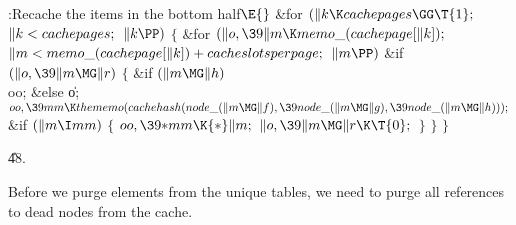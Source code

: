 \B{}:Recache the items in the bottom half\X${}\E{}$\6
\&{for} ${}(\|k\K\\{cachepages}\GG\T{1};{}$ ${}\|k<\\{cachepages};{}$ ${}\|k%
\PP){}$\5
${}\{{}$\1\6
\&{for} ${}(\|o,\39\|m\K\\{memo\_}(\\{cachepage}[\|k]);{}$ ${}\|m<\\{memo\_}(%
\\{cachepage}[\|k])+\\{cacheslotsperpage};{}$ ${}\|m\PP){}$\1\6
\&{if} ${}(\|o,\39\|m\MG\|r){}$\5
${}\{{}$\1\6
\&{if} ${}(\|m\MG\|h){}$\1\5
\\{oo};\5
\2\&{else}\1\5
\|o;\2\6
${}\\{oo},\39\\{mm}\K\\{thememo}(\\{cachehash}(\\{node\_}(\|m\MG\|f),\39\\{node%
\_}(\|m\MG\|g),\39\\{node\_}(\|m\MG\|h)));{}$\6
\&{if} ${}(\|m\I\\{mm}){}$\5
${}\{{}$\1\6
${}\\{oo},\39{*}\\{mm}\K{*}\|m;{}$\6
${}\|o,\39\|m\MG\|r\K\T{0};{}$\6
\4${}\}{}$\2\6
\4${}\}{}$\2\2\6
\4${}\}{}$\2\par
\U48.\fi

Before we purge elements from the unique tables, we need to purge all
references to dead nodes from the cache.

